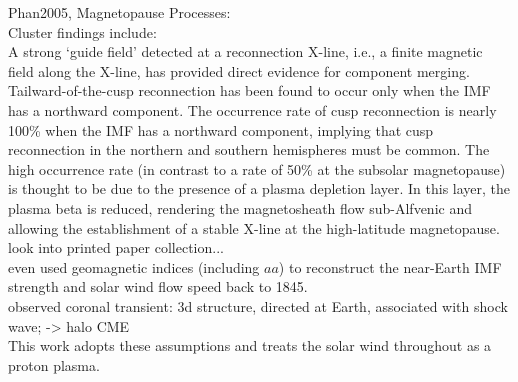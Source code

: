 Phan2005, Magnetopause Processes:\\
Cluster findings include:\\
A strong ‘guide field’ detected at a reconnection X-line, i.e., a finite magnetic field along the X-line, has provided direct evidence for component merging.\\
Tailward-of-the-cusp reconnection has been found to occur only when the IMF has a northward component. The occurrence rate of cusp reconnection is nearly 100\% when the IMF has a northward component, implying that cusp reconnection in the northern and southern hemispheres must be common. The high occurrence rate (in contrast to a rate of 50\% at the subsolar magnetopause) is thought to be due to the presence of a plasma depletion layer. In this layer, the plasma beta is reduced, rendering the magnetosheath flow sub-Alfvenic and allowing the establishment of a stable X-line at the high-latitude magnetopause.\\

look into printed paper collection...\\

\citet{Lockwood2014} even used geomagnetic indices (including $aa$) to reconstruct the near-Earth IMF strength and solar wind flow speed back to 1845.\\

observed coronal transient: 3d structure, directed at Earth, associated with shock wave; \citep{Howard1982} -> halo CME\\

This work adopts these assumptions and treats the solar wind throughout as a proton plasma.\\



